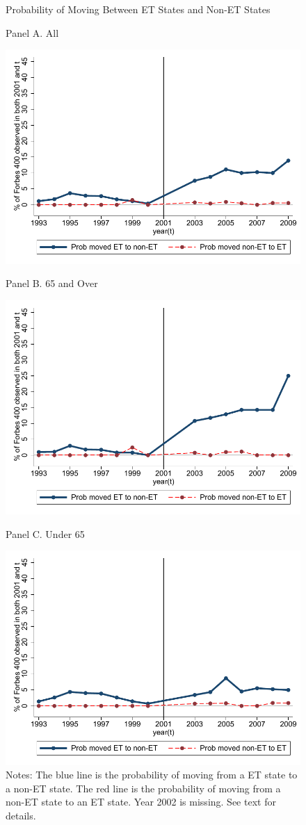 \documentclass[12pt]{article}
\begin{document}
\begin{figure}
\centering
\caption{Probability of Moving Between ET States and Non-ET States}
	\caption*{Panel A. All}
	\includegraphics[width=.55\textwidth]{../Figures/Figure8_a.pdf}
	\caption*{Panel B. 65 and Over}
	\includegraphics[width=.55\textwidth]{../Figures/Figure8_b.pdf}
	\caption*{Panel C. Under 65}
	\includegraphics[width=.55\textwidth]{../Figures/Figure8_c.pdf}
	\caption*{\footnotesize Notes: The blue line is the probability of moving from a ET state to a non-ET state. The red line is the probability of moving from a non-ET state to an ET state. Year 2002 is missing. See text for details.}
\label{pre}
\end{figure}
\clearpage




%
\end{document}
